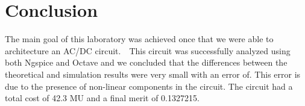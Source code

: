 \section{Conclusion}
\label{sec:conclusion}

The main goal of this laboratory was achieved once that we were able to architecture an AC/DC circuit.    This circuit was successfully analyzed using both Ngspice and Octave and we concluded that the differences between the theoretical and simulation results were very small with an error of. This error is due to the presence of non-linear components in the circuit. The circuit had a total cost of 42.3 MU and a final merit of 0.1327215.




